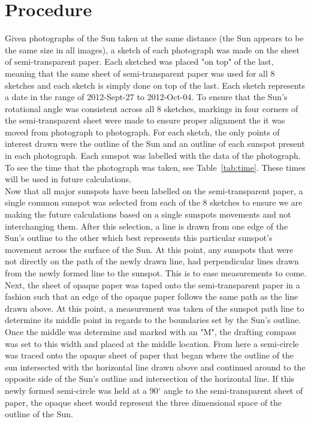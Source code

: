 \documentclass{article}
\begin{document}
\section{Procedure}

Given photographs of the Sun taken at the same distance (the Sun appears to be the same size in all images), a sketch of each
photograph was made on the sheet of semi-transparent paper. Each sketched was placed "on top" of the last, meaning that
the same sheet of semi-transparent paper was used for all 8 sketches and each sketch is simply done on top of the last.
Each sketch represents a date in the range of 2012-Sept-27 to 2012-Oct-04.  To
ensure that the Sun's rotational angle was consistent across all 8 sketches, markings in four corners of the semi-transparent
sheet were made to ensure proper alignment the it was moved from photograph to photograph. For each sketch, the only 
points of interest drawn were the outline of the Sun and an outline of each sunspot present in each photograph. Each sunspot
was labelled with the data of the photograph. To see the time that the photograph was taken, see Table~\ref{tab:time}.
These times will be used in future calculations.\\

Now that all major sunspots have been labelled on the semi-transparent paper, a single common sunspot was selected from
each of the 8 sketches to ensure we are making the future calculations based on a single sunspots movements and not
interchanging them. After this selection, a line is drawn from one edge of the Sun's outline to the other which best represents
this particular sunspot's movement across the surface of the Sun. At this point, any sunspots that were not directly on the
path of the newly drawn line, had perpendicular lines drawn from the newly formed line to the sunspot. This is to ease
measurements to come.\\

Next, the sheet of opaque paper was taped onto the semi-transparent paper in a fashion such that an edge of the opaque
paper follows the same path as the line drawn above. At this point, a measurement was taken of the sunspot path line to 
determine its middle point in regards to the boundaries set by the Sun's outline. Once the middle was determine and marked
with an "M", the 
drafting compass was set to this width and placed at the middle location. From here a semi-circle was traced onto the 
opaque sheet of paper that began where the outline of the sun intersected with the horizontal line drawn above and
continued around to the opposite side of the Sun's outline and intersection of the horizontal line. If this newly formed
semi-circle was held at a 90$^\circ$ angle to the semi-transparent sheet of paper, the opaque sheet would represent
the three dimensional space of the outline of the Sun.\\
\end{document}
